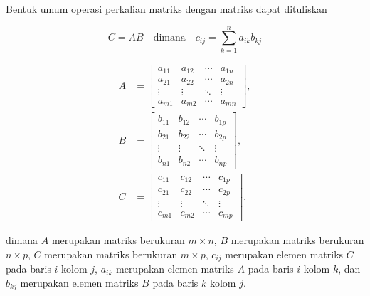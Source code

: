 Bentuk umum operasi perkalian matriks dengan matriks dapat dituliskan

\begin{equation}
	\label{eq:matrix_mult_matrix}C = AB \quad \text{dimana}\quad c_{ij}= \sum_{k=1}
	^{n}a_{ik}b_{kj}
\end{equation}

\begin{align*}
	A & = \begin{bmatrix}a_{11}&a_{12}&\cdots&a_{1n}\\ a_{21}&a_{22}&\cdots&a_{2n}\\ \vdots&\vdots&\ddots&\vdots \\ a_{m1}&a_{m2}&\cdots&a_{mn}\end{bmatrix}, \\
	B & = \begin{bmatrix}b_{11}&b_{12}&\cdots&b_{1p}\\ b_{21}&b_{22}&\cdots&b_{2p}\\ \vdots&\vdots&\ddots&\vdots \\ b_{n1}&b_{n2}&\cdots&b_{np}\end{bmatrix}, \\
	C & = \begin{bmatrix}c_{11}&c_{12}&\cdots&c_{1p}\\ c_{21}&c_{22}&\cdots&c_{2p}\\ \vdots&\vdots&\ddots&\vdots \\ c_{m1}&c_{m2}&\cdots&c_{mp}\end{bmatrix}.
\end{align*}

\noindent
dimana $A$ merupakan matriks berukuran $m \times n$, $B$ merupakan matriks
berukuran $n \times p$, $C$ merupakan matriks berukuran $m \times p$, $c_{ij}$
merupakan elemen matriks $C$ pada baris $i$ kolom $j$, $a_{ik}$ merupakan elemen
matriks $A$ pada baris $i$ kolom $k$, dan $b_{kj}$ merupakan elemen matriks $B$
pada baris $k$ kolom $j$.

